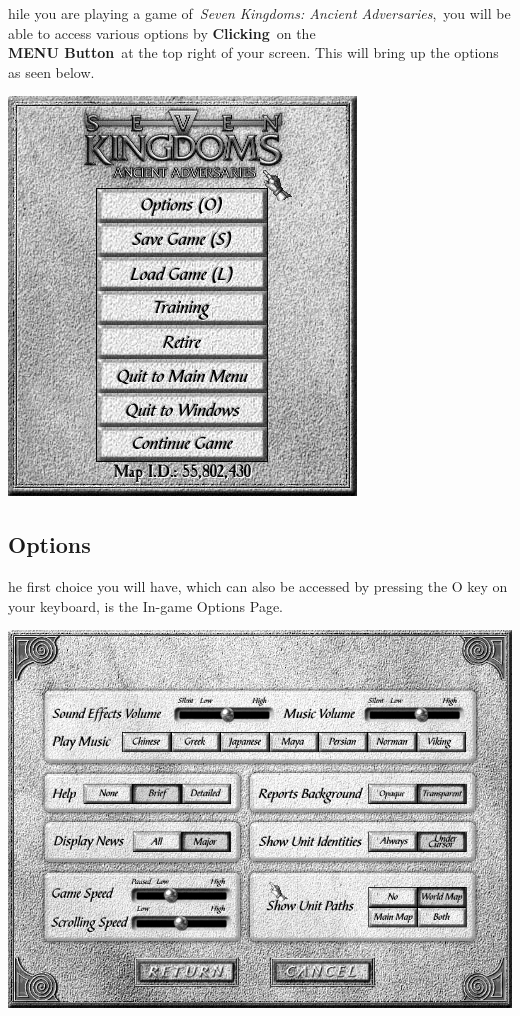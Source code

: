 hile you are playing a game of \textit{Seven Kingdoms: Ancient Adversaries}, you will be able to access various options by \textbf{Clicking} on the \\ %
\textbf{MENU Button} at the top right of your screen. This will bring up the options as seen below.


\begin{center}
\includegraphics[width=0.5\linewidth]{Imainmenu}
\end{center}

\subsection{Options}

he first choice you will have, which can also be accessed by pressing the O key on your keyboard, is the In-game Options Page.

\begin{center}
	\includegraphics[width=0.9\linewidth]{Ioptions}
\end{center}

